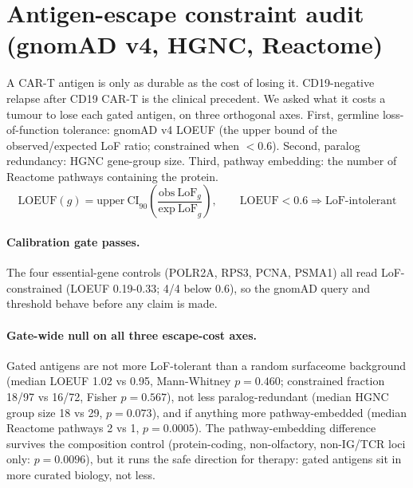 \section{Antigen-escape constraint audit (gnomAD v4, HGNC, Reactome)}
\label{sec:constraint}
A CAR-T antigen is only as durable as the cost of losing it. CD19-negative relapse after CD19 CAR-T is the clinical precedent.
We asked what it costs a tumour to lose each gated antigen, on three orthogonal axes.
First, germline loss-of-function tolerance: gnomAD v4 LOEUF (the upper bound of the observed/expected LoF ratio; constrained when $<0.6$).
Second, paralog redundancy: HGNC gene-group size.
Third, pathway embedding: the number of Reactome pathways containing the protein.
\begin{equation}
\mathrm{LOEUF}(g) = \mathrm{upper\ CI}_{90}\!\left(\frac{\mathrm{obs\ LoF}_g}{\mathrm{exp\ LoF}_g}\right), \qquad \mathrm{LOEUF} < 0.6 \Rightarrow \text{LoF-intolerant}
\end{equation}
\paragraph{Calibration gate passes.} The four essential-gene controls (POLR2A, RPS3, PCNA, PSMA1) all read LoF-constrained (LOEUF 0.19-0.33; 4/4 below 0.6), so the gnomAD query and threshold behave before any claim is made.
\paragraph{Gate-wide null on all three escape-cost axes.} Gated antigens are not more LoF-tolerant than a random surfaceome background (median LOEUF 1.02 vs 0.95, Mann-Whitney $p=0.460$; constrained fraction 18/97 vs 16/72, Fisher $p=0.567$), not less paralog-redundant (median HGNC group size 18 vs 29, $p=0.073$), and if anything more pathway-embedded (median Reactome pathways 2 vs 1, $p=0.0005$).
The pathway-embedding difference survives the composition control (protein-coding, non-olfactory, non-IG/TCR loci only: $p=0.0096$), but it runs the safe direction for therapy: gated antigens sit in more curated biology, not less.
